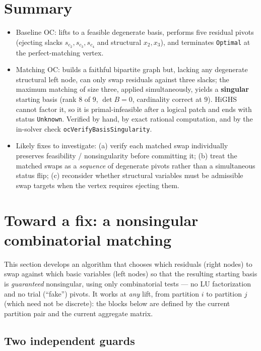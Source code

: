 \documentclass[11pt]{article}
\newcommand{\slack}[1]{s_{#1}}
\begin{document}
\section{Summary}

\begin{itemize}[nosep]
  \item Baseline OC: lifts to a feasible degenerate basis, performs five residual
  pivots (ejecting slacks $\slack{c_2},\slack{c_3},\slack{c_4}$ and structural
  $x_2,x_3$), and terminates \texttt{Optimal} at the perfect-matching vertex.
  \item Matching OC: builds a faithful bipartite graph but, lacking any
  degenerate structural left node, can only swap residuals against three slacks;
  the maximum matching of size three, applied simultaneously, yields a
  \textbf{singular} starting basis (rank $8$ of $9$, $\det B = 0$, cardinality
  correct at $9$). HiGHS cannot factor it, so it is primal-infeasible after a
  logical patch and ends with status \texttt{Unknown}. Verified by hand, by exact
  rational computation, and by the in-solver check \texttt{ocVerifyBasisSingularity}.
  \item Likely fixes to investigate: (a) verify each matched swap individually
  preserves feasibility / nonsingularity before committing it; (b) treat the
  matched swaps as a \emph{sequence} of degenerate pivots rather than a
  simultaneous status flip; (c) reconsider whether structural variables must be
  admissible swap targets when the vertex requires ejecting them.
\end{itemize}

\section{Toward a fix: a nonsingular combinatorial matching}

This section develops an algorithm that chooses which residuals (right nodes) to
swap against which basic variables (left nodes) so that the resulting starting
basis is \emph{guaranteed} nonsingular, using only combinatorial tests --- no LU
factorization and no trial (``fake'') pivots. It works at \emph{any} lift, from
partition $i$ to partition $j$ (which need not be discrete): the blocks below are
defined by the current partition pair and the current aggregate matrix.

\subsection{Two independent guards}
\end{document}
